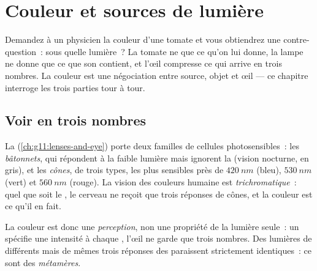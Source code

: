 \chapter{Couleur et sources de lumière}\label{ch:g11:color-light-sources}

Demandez à un physicien la couleur d'une tomate et vous obtiendrez une
contre-question~: sous quelle lumière~? La tomate ne
 que ce qu'on lui donne, la lampe ne donne que ce
que son  contient, et l'œil compresse ce qui
arrive en trois nombres. La couleur est une négociation entre source,
objet et œil --- ce chapitre interroge les trois parties tour à tour.

\section{Voir en trois nombres}

\begin{definition}\label{def:g11:color-light-sources:cones}
La  (\cref{ch:g11:lenses-and-eye}) porte deux familles
de cellules photosensibles~: les \emph{bâtonnets}, qui
répondent à la faible lumière mais ignorent la
 (vision nocturne, en gris), et
les \emph{cônes}, de trois types, les plus sensibles près de
$\qty{420}{nm}$ (bleu), $\qty{530}{nm}$ (vert) et $\qty{560}{nm}$
(rouge). La vision des couleurs humaine est
\emph{trichromatique}~: quel que soit le
, le cerveau ne reçoit que trois réponses de
cônes, et la couleur est ce qu'il en fait.
\end{definition}

\begin{definition}\label{def:g11:color-light-sources:perception}
La couleur est donc une \emph{perception}, non une propriété de la
lumière seule~: un  spécifie une intensité à
chaque , l'œil ne garde que trois
nombres. Des lumières de  différents mais de mêmes trois
réponses des  paraissent strictement
identiques~: ce sont des \emph{métamères}.
\end{definition}

